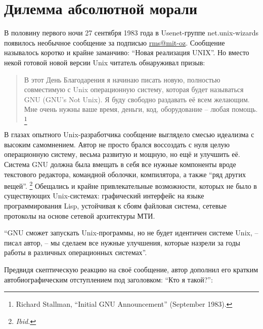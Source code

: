 
\chapter{Дилемма абсолютной морали}

В половину первого ночи 27 сентября 1983 года в Usenet-группе net.unix-wizards появилось необычное сообщение за подписью \url{rms@mit-oz}. Сообщение называлось коротко и крайне заманчиво: \enquote{Новая реализация UNIX}. Но вместо некой готовой новой версии Unix читатель обнаруживал призыв:

\begin{quote}
В этот День Благодарения я начинаю писать новую, полностью совместимую с Unix операционную систему, которая будет называться GNU (GNU's Not Unix). Я буду свободно раздавать её всем желающим. Мне очень нужны ваше время, деньги, код, оборудование -- любая помощь. \footnote{Richard Stallman, \enquote{Initial GNU Announcement} (September 1983).}
\end{quote}

В глазах опытного Unix-разработчика сообщение выглядело смесью идеализма с высоким самомнением. Автор не просто брался воссоздать с нуля целую операционную систему, весьма развитую и мощную, но ещё и улучшить её. Система GNU должна была вмещать в себя все нужные компоненты вроде текстового редактора, командной оболочки, компилятора, а также \enquote{ряд других вещей}. \footnote{\textit{Ibid.}} Обещались и крайне привлекательные возможности, которых не было в существующих Unix-системах: графический интерфейс на языке программирования Lisp, устойчивая к сбоям файловая система, сетевые протоколы на основе сетевой архитектуры МТИ.

\enquote{GNU сможет запускать Unix-программы, но не будет идентичен системе Unix, -- писал автор, -- мы сделаем все нужные улучшения, которые назрели за годы работы в различных операционных системах}.

Предвидя скептическую реакцию на своё сообщение, автор дополнил его кратким автобиографическим отступлением под заголовком: \enquote{Кто я такой?}:

